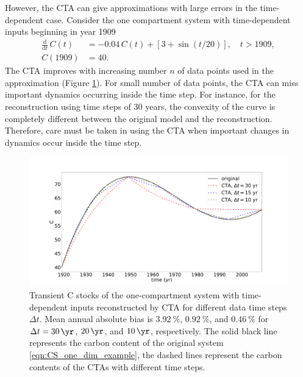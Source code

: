 \documentclass[draft]{agujournal2019}
\newcommand{\deriv}[1]{\frac{\mathrm{d}}{\mathrm{d}#1}}
\begin{document}
However, the CTA can give approximations with large errors in the time-dependent case. 
Consider the one compartment system with time-dependent inputs beginning in year 1909
\begin{equation}\label{eqn:CS_one_dim_example}
    \begin{aligned}
        \deriv{t}\,C(t) &= -0.04\,C(t) + \left[3+\sin(t/20)\right],\quad t>1909,\\
        C(1909) &= 40.
    \end{aligned}
\end{equation}
 The CTA improves with increasing number $n$ of data points used in the approximation (Figure \ref{fig:CS_one_dim_example}).
 For small number of data points, the CTA can miss important dynamics occurring inside the time step. For instance, for the reconstruction using time steps of 30 years, the convexity of the curve is completely different between the original model and the reconstruction. Therefore, care must be taken in using the CTA when important changes in dynamics occur inside the time step. 

\begin{figure}[htbp]
    \centering 
    \includegraphics[width=1.0\linewidth]{figs/interpol_pwc_1.pdf}
    \caption{Transient C stocks of the one-compartment system with time-dependent inputs reconstructed by CTA for different data time steps $\Delta t$.
    Mean annual absolute bias is $\SI{3.92}{\percent}$, $\SI{0.92}{\percent}$, and $\SI{0.46}{\percent}$ for $\Delta{t} = \SI{30}{\yr}$, $\SI{20}{\yr}$, and $\SI{10}{\yr}$, respectively.
    The solid black line represents the carbon content of the original system \eqref{eqn:CS_one_dim_example}, the dashed lines represent the carbon contents of the CTAs with different time steps.}    
    \label{fig:CS_one_dim_example}
\end{figure}        
\end{document}
